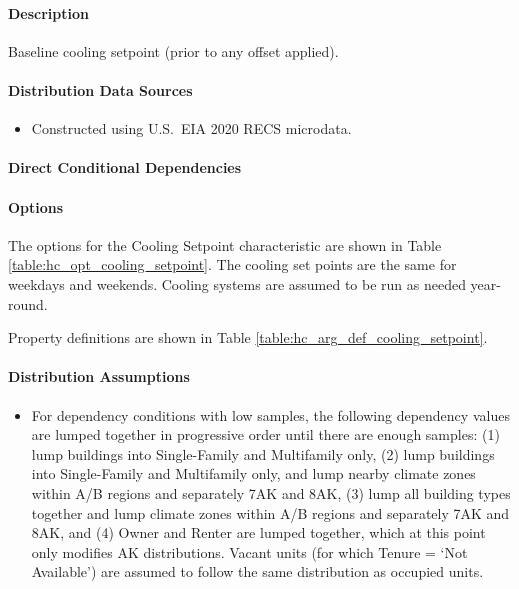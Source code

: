 \paragraph{Description}
% 
Baseline cooling setpoint (prior to any offset applied).

\paragraph{Distribution Data Sources}
% 
\begin{itemize}
    \item Constructed using U.S.~EIA 2020 RECS microdata.
\end{itemize}

\paragraph{Direct Conditional Dependencies}


\paragraph{Options}
The options for the Cooling Setpoint characteristic are shown in Table \ref{table:hc_opt_cooling_setpoint}. The cooling set points are the same for weekdays and weekends. Cooling systems are assumed to be run as needed year-round.



Property definitions are shown in Table \ref{table:hc_arg_def_cooling_setpoint}.



\paragraph{Distribution Assumptions}
% 
\begin{itemize}
    \item For dependency conditions with low samples, the following dependency values are lumped together in progressive order until there are enough samples: (1) lump buildings into Single-Family and Multifamily only, (2) lump buildings into Single-Family and Multifamily only, and lump nearby climate zones within A/B regions and separately 7AK and 8AK, (3) lump all building types together and lump climate zones within A/B regions and separately 7AK and 8AK, and (4) Owner and Renter are lumped together, which at this point only modifies AK distributions. Vacant units (for which Tenure = ‘Not Available’) are assumed to follow the same distribution as occupied units.
\end{itemize}
